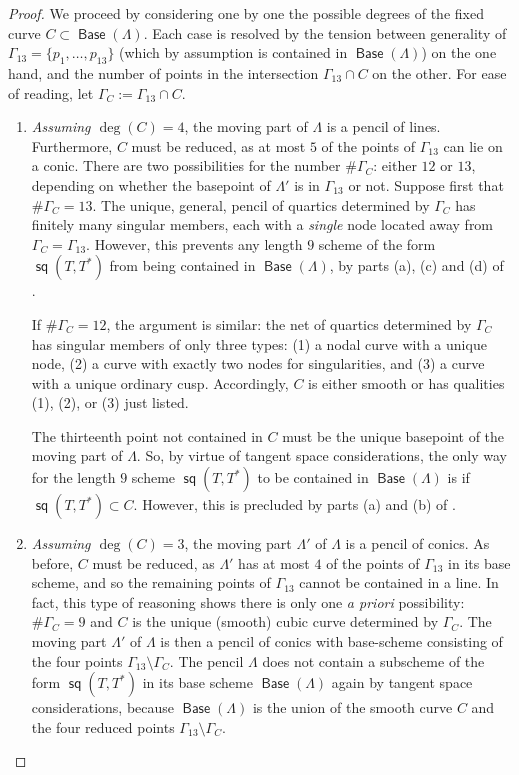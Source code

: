 \documentclass[reqno, 11pt]{amsart}
\theoremstyle{plain}
\theoremstyle{remark}
\DeclareMathOperator{\s}{\mathsf{sq}}
\DeclareMathOperator{\Base}{\mathsf{Base}}
\begin{document}
\begin{proof}
  We proceed by considering one by one the possible degrees of the
  fixed curve $C \subset \Base(\Lambda)$. Each case is resolved by the tension between 
  generality of $\Gamma_{13} = \{p_1, \dots, p_{13}\}$ (which by assumption is contained in $\Base(\Lambda)$) on the one hand, and the number of points in the intersection $\Gamma_{13} \cap C$ on the other. For ease of reading, let $\Gamma_{C} := \Gamma_{13} \cap C$.


\begin{enumerate}
  \item \emph{Assuming $\deg (C) = 4$},  the moving part of $\Lambda$ is a pencil of
  lines. Furthermore, $C$ must be reduced, as at most $5$ of the
  points of $\Gamma_{13}$ can lie on a conic. There are
  two possibilities for the number $\# \Gamma_{C}$: either $12$ or $13$, depending on whether the basepoint of $\Lambda'$ is in $\Gamma_{13}$ or not. Suppose first that $\# \Gamma_{C} = 13$. The unique, general, pencil of quartics
  determined by $\Gamma_{C}$ has finitely many singular members, each
  with a {\sl single} node located away from
  $\Gamma_{C} = \Gamma_{13}$. However, this prevents any length $9$
  scheme of the form $\s(T,T^{*})$ from being contained in $\Base(\Lambda)$, by parts (a), (c) and (d) of .  
  
  If
  $\# \Gamma_{C} = 12$, the argument is similar: the net of quartics
  determined by $\Gamma_{C}$ has singular members of only three types:
  (1) a nodal curve with a unique node, (2) a curve with exactly two
  nodes for singularities, and (3) a curve with a unique ordinary cusp.  Accordingly, $C$ is either smooth or has qualities (1), (2), or (3) just listed.  
  
  The thirteenth point not contained in $C$ must be the unique 
  basepoint of the moving part of $\Lambda$. So, by virtue of tangent space considerations, the only way
  for the length $9$ scheme $\s(T,T^{*})$ to be contained in
  $\Base(\Lambda)$ is if $\s(T,T^{*}) \subset C$. However, this is precluded by parts (a) and (b) of .

  \item \emph{Assuming $\deg (C) = 3$}, the moving part $\Lambda'$ of $\Lambda$ is a pencil of
  conics. As before, $C$ must be reduced, as $\Lambda'$ has at
  most $4$ of the points of $\Gamma_{13}$ in its base scheme, and so  the remaining points of $\Gamma_{13}$ cannot be contained in a line.
  In fact, this type of reasoning shows there is only one {\sl a priori}
  possibility: $\# \Gamma_{C} = 9$ and $C$ is the unique (smooth)
  cubic curve determined by $\Gamma_{C}$. The moving part $\Lambda'$ of $\Lambda$ is then a
  pencil of conics with base-scheme consisting of the four points 
  $\Gamma_{13} \setminus \Gamma_{C}$. The pencil $\Lambda$ 
  does not contain a subscheme of the form $\s(T,T^{*})$ in its base
  scheme $\Base(\Lambda)$ again by tangent space considerations, because $\Base(\Lambda)$ is the union of the smooth curve $C$ and the four reduced points $\Gamma_{13} \setminus \Gamma_{C}$.


\end{enumerate}
\end{proof}
\end{document}
